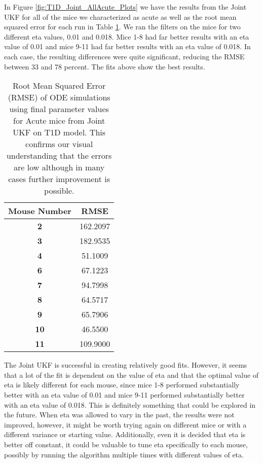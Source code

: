 \documentclass{article}
\begin{document}
In Figure \ref{fig:T1D_Joint_AllAcute_Plots} we have the results from the Joint UKF for all of the mice we characterized as acute as well as the root mean squared error for each run in Table \ref{table:T1D_Joint_AllAcute_RMSE}. We ran the filters on the mice for two different eta values, 0.01 and 0.018. Mice 1-8 had far better results with an eta value of  0.01 and mice 9-11 had far better results  with an eta value of 0.018. In each case, the resulting differences were quite significant, reducing the RMSE between 33 and 78 percent. The fits above show the best results.

\begin{table}[H]
  \begin{center}
    \label{tab:table1}
    \begin{tabular}{c|c} %
      \textbf{Mouse Number} & \textbf{RMSE} \\
      \hline
      \textbf{2} &  162.2097\\
      \textbf{3} & 182.9535\\
      \textbf{4} & 51.1009\\
      \textbf{6} & 67.1223\\
      \textbf{7} & 94.7998\\
      \textbf{8} & 64.5717\\
      \textbf{9} & 65.7906\\
      \textbf{10} & 46.5500\\
      \textbf{11} & 109.9000
    \end{tabular}
    \caption{Root Mean Squared Error (RMSE) of ODE simulations using final parameter values for Acute mice from Joint UKF on T1D model. This confirms our visual understanding that the errors are low although in many cases further improvement is possible.}
    \label{table:T1D_Joint_AllAcute_RMSE}
  \end{center}
\end{table}

The Joint UKF is successful in creating relatively good fits. However, it seems that a lot of the fit is dependent on the value of eta and that the optimal value of eta is likely different for each mouse, since mice 1-8 performed substantially better with an eta value of 0.01 and mice 9-11 performed substantially better with an eta value of 0.018. This is definitely something that could be explored in the future. When eta was allowed to vary in the past, the results were not improved, however, it might be worth trying again on different mice or with a different variance or starting value. Additionally, even it is decided that eta is better off constant, it could be valuable to tune  eta specifically to each mouse, possibly by running the algorithm multiple times with different values of eta.
\end{document}
